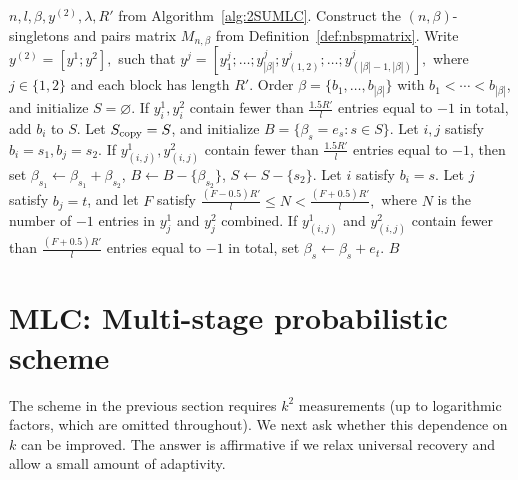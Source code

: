 \documentclass{article}
\begin{document}
\begin{algorithm}
\caption{Second-stage decoding algorithm for the two-stage MLC scheme
(see Algorithm~\ref{alg:2SUMLC} for the first stage)}
\label{alg:mlcdadec}
\begin{algorithmic}[1]
\Require $n,l,\beta,y^{(2)},\lambda,R'$ from Algorithm~\ref{alg:2SUMLC}.
\State Construct the $(n,\beta)$-singletons and pairs matrix $M_{n,\beta}$ from Definition~\ref{def:nbspmatrix}.
\State Write
\(
y^{(2)}=[y^1;y^2],\) such that \(
y^j=[y_1^j;\ldots;y_{|\beta|}^j;
y_{(1,2)}^j;\ldots;y_{(|\beta|-1,|\beta|)}^j],
\)
where $j\in\{1,2\}$ and each block has length $R'$.
\State Order $\beta=\{b_1,\ldots,b_{|\beta|}\}$ with $b_1<\cdots<b_{|\beta|}$, and initialize $S=\varnothing$.
    \State If $y_i^1,y_i^2$ contain fewer than $\frac{1.5R'}{l}$ entries equal to $-1$ in total, add $b_i$ to $S$.
\EndFor
\State Let $S_{\rm copy}=S$, and initialize $B=\{\beta_s=e_s:s\in S\}$.
    \State Let $i,j$ satisfy $b_i=s_1,b_j=s_2$. If $y_{(i,j)}^1,y_{(i,j)}^2$ contain fewer than $\frac{1.5R'}{l}$ entries equal to $-1$, then set $\beta_{s_1}\leftarrow\beta_{s_1}+\beta_{s_2}$, $B\leftarrow B-\{\beta_{s_2}\}$, $S\leftarrow S-\{s_2\}$.
\EndFor
{}
    \State Let $i$ satisfy $b_i=s$.
        \State Let $j$ satisfy $b_j=t$, and let $F$ satisfy
        \(
        \frac{(F-0.5)R'}{l}\leq N<\frac{(F+0.5)R'}{l},
        \)
        where $N$ is the number of $-1$ entries in $y_j^1$ and $y_j^2$ combined. If $y_{(i,j)}^1$ and $y_{(i,j)}^2$ contain fewer than
        $\frac{(F+0.5)R'}{l}$ entries equal to $-1$ in total, set
        $\beta_s\leftarrow\beta_s+e_t$.
    \EndFor
\EndFor
\State \Return $B$
\end{algorithmic}
\end{algorithm}

\section{MLC: Multi-stage probabilistic scheme}\label{sec:3SPMLC} 
The scheme in the previous section requires $k^2$ measurements (up to logarithmic factors, which are omitted throughout). We next ask whether this dependence on $k$ can be improved. The answer is affirmative if we relax universal recovery and allow a small amount of adaptivity.
\end{document}
